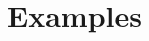 \documentclass[lecture]{beamer}
\newcommand{\vect}[1]{\ensuremath{\boldsymbol{\mathrm{#1}}}}
\newcommand{\mth}{\textcolor{myRed2}{\vect\theta}}
\newcommand{\pnu}{\textcolor{myBlue3}{\vect\nu}}
\newcommand{\kap}{\boldsymbol\kappa}
\newcommand{\sv}{\vect s}
\newcommand{\av}{\vect a}
\newcommand{\Lth}{L_{\mth}}
\newcommand{\rth}{\rho_{\mth}}
\newcommand{\pin}{\pi_{\pnu}}
\newcommand{\Jh}{\hat J_{\mth}}
\newcommand{\Fres}{\vect F}
\newcommand{\LR}{\textcolor{myOrangeD}{\textbf{LR}}}
\newcommand{\PD}{\textcolor{myGreen3}{\textbf{PD}}}
\begin{document}

\section{Examples}
\end{document}
